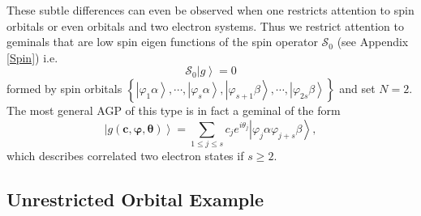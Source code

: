 \documentclass[aps,preprint]{revtex4}%
\begin{document}
These subtle differences can even be observed when one restricts attention to
spin orbitals or even orbitals and two electron systems. Thus we restrict
attention to geminals that are low spin eigen functions of the spin operator
$\mathcal{S}_{0}$ (see Appendix \ref{Spin}) i.e.
\begin{equation}
\mathcal{S}_{0}\left\vert g\right\rangle =0
\end{equation}
formed by spin orbitals $\left\{  \left\vert \varphi_{1}\alpha\right\rangle
,\cdots,\left\vert \varphi_{s}\alpha\right\rangle ,\left\vert \varphi
_{s+1}\beta\right\rangle ,\cdots,\left\vert \varphi_{2s}\beta\right\rangle
\right\}  $ and set $N=2$. The most general AGP of this type is in fact a
geminal of the form%
\begin{equation}
\left\vert g\left(  \boldsymbol{c},\boldsymbol{\varphi,\theta}\right)
\right\rangle =\sum_{1\leq j\leq s}c_{j}e^{i\theta_{j}}\left\vert \varphi
_{j}\alpha\varphi_{j+s}\beta\right\rangle ,\label{spinorbgem}%
\end{equation}
which describes correlated two electron states if $s\geq2$.

\subsection{Unrestricted Orbital Example}
\end{document}
